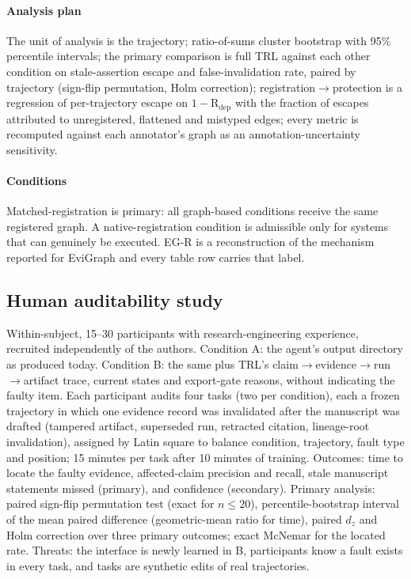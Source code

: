 \documentclass[journal]{IEEEtran}
\begin{document}
\paragraph{Analysis plan} The unit of analysis is the trajectory; ratio-of-sums cluster bootstrap with 95\% percentile intervals; the primary comparison is full TRL against each other condition on stale-assertion escape and false-invalidation rate, paired by trajectory (sign-flip permutation, Holm correction); registration$\to$protection is a regression of per-trajectory escape on $1-\mathrm{R}_{\mathrm{dep}}$ with the fraction of escapes attributed to unregistered, flattened and mistyped edges; every metric is recomputed against each annotator's graph as an annotation-uncertainty sensitivity.
\paragraph{Conditions} Matched-registration is primary: all graph-based conditions receive the same registered graph. A native-registration condition is admissible only for systems that can genuinely be executed. EG-R is a reconstruction of the mechanism reported for EviGraph and every table row carries that label.

\subsection{Human auditability study}
Within-subject, 15--30 participants with research-engineering experience, recruited independently of the authors. Condition A: the agent's output directory as produced today. Condition B: the same plus TRL's claim$\to$evidence$\to$run$\to$artifact trace, current states and export-gate reasons, without indicating the faulty item. Each participant audits four tasks (two per condition), each a frozen trajectory in which one evidence record was invalidated after the manuscript was drafted (tampered artifact, superseded run, retracted citation, lineage-root invalidation), assigned by Latin square to balance condition, trajectory, fault type and position; 15 minutes per task after 10 minutes of training. Outcomes: time to locate the faulty evidence, affected-claim precision and recall, stale manuscript statements missed (primary), and confidence (secondary). Primary analysis: paired sign-flip permutation test (exact for $n\le20$), percentile-bootstrap interval of the mean paired difference (geometric-mean ratio for time), paired $d_z$ and Holm correction over three primary outcomes; exact McNemar for the located rate. Threats: the interface is newly learned in B, participants know a fault exists in every task, and tasks are synthetic edits of real trajectories.
\end{document}
